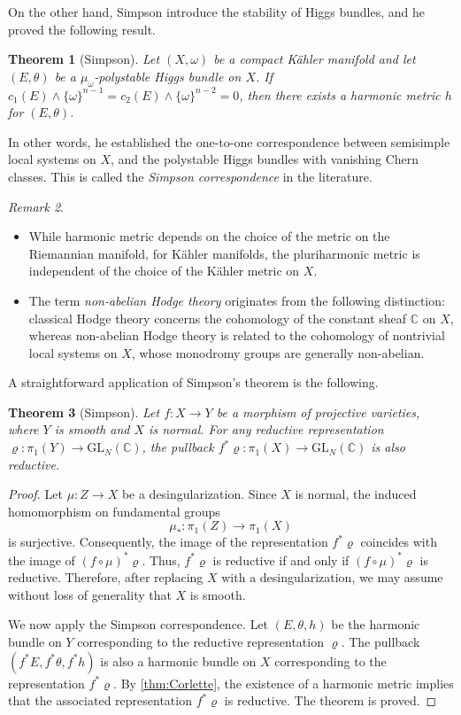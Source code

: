 \documentclass[english]{amsproc}
\theoremstyle{plain}
\newtheorem{thm}{Theorem}[section]
\theoremstyle{definition}
\theoremstyle{remark}
\newtheorem{rem}[thm]{Remark}
\theoremstyle{plain}
\numberwithin{equation}{thm} %
\begin{document}
On the other hand, Simpson introduce the stability of Higgs bundles, and he proved the following result.
\begin{thm}[Simpson]\label{thm:Simpson}
	Let $(X,\omega)$ be a compact K\"ahler manifold and let $(E,\theta)$ be  a $\mu_\omega$-polystable Higgs bundle on $X$. If $c_1(E)\wedge \{\omega\}^{n-1}=c_2(E)\wedge\{\omega\}^{n-2}=0$, then there exists a harmonic metric $h$ for $(E,\theta)$. 
\end{thm}
In other words, he established the one-to-one correspondence between semisimple local systems on $X$, and the polystable Higgs bundles with vanishing Chern classes.  This is called the \emph{Simpson correspondence} in the literature.  
\begin{rem}
	\begin{itemize}
		\item  	While harmonic metric depends on the choice of the metric on the Riemannian manifold, for K\"ahler manifolds, the pluriharmonic metric is independent of the choice of the K\"ahler metric on $X$.
		\item The term \emph{non-abelian Hodge theory} originates from the following distinction: 
		classical Hodge theory concerns the cohomology of the constant sheaf \(\mathbb{C}\) on \(X\), 
		whereas non-abelian Hodge theory is related to the cohomology of nontrivial local systems on \(X\), 
		whose monodromy groups are generally non-abelian.
	\end{itemize} 
\end{rem}
A straightforward application of Simpson's theorem is the following.
\begin{thm}[Simpson]\label{thm:reductive}
	Let $f \colon X \to Y$ be a morphism of projective varieties, where $Y$ is smooth and $X$ is normal. For any reductive representation $\varrho \colon \pi_1(Y) \to \mathrm{GL}_{N}(\mathbb{C})$, the pullback $f^*\varrho \colon \pi_1(X) \to \mathrm{GL}_{N}(\mathbb{C})$ is also reductive.
\end{thm}

\begin{proof}
	Let $\mu \colon Z \to X$ be a desingularization. Since $X$ is normal, the induced homomorphism on fundamental groups
	\[
	\mu_*: \pi_1(Z) \longrightarrow \pi_1(X)
	\]
	is surjective. Consequently, the image of the representation $f^*\varrho$ coincides with the image of $(f \circ \mu)^*\varrho$. Thus, $f^*\varrho$ is reductive if and only if $(f \circ \mu)^*\varrho$ is reductive. Therefore, after replacing $X$ with a desingularization, we may assume without loss of generality that $X$ is smooth.
	
	We now apply the Simpson correspondence. Let $(E,\theta,h)$ be the harmonic bundle on $Y$ corresponding to the reductive representation $\varrho$. The pullback $(f^*E, f^*\theta, f^*h)$ is also a harmonic bundle on $X$ corresponding to the representation $f^*\varrho$. By \cref{thm:Corlette}, the existence of a harmonic metric implies that the associated representation $f^*\varrho$ is reductive. The theorem is proved.
\end{proof}
\end{document}
